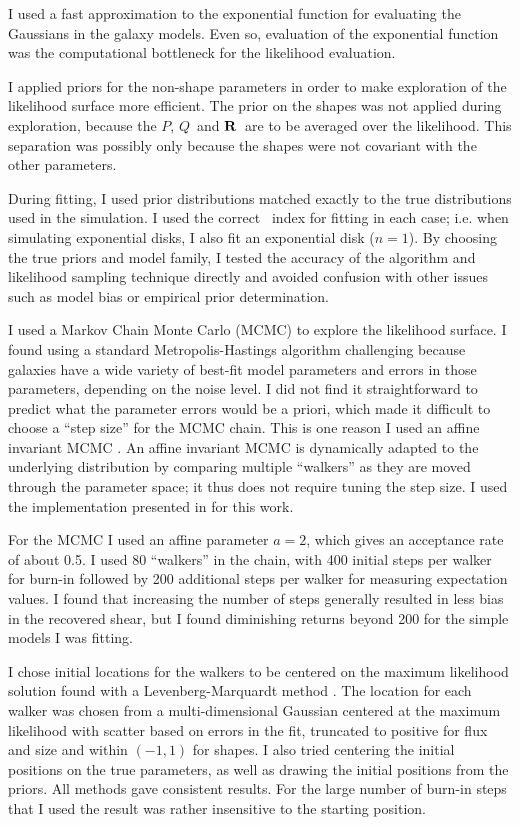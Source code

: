 \documentclass[usegraphicx,usenatbib]{mn2e}
\newcommand{\vecQ}{\mbox{\boldmath $Q$}}
\newcommand{\matR}{\mbox{$\bf R$}}
\begin{document}
I used a fast approximation to the exponential function for evaluating the
Gaussians in the galaxy models.  Even so, evaluation of the exponential
function was the computational bottleneck for the likelihood evaluation.

I applied priors for the non-shape parameters in order to make exploration of
the likelihood surface more efficient.  The prior on the shapes was not applied
during exploration, because the $P$, \vecQ\ and \matR\ are to be averaged over
the likelihood.  This separation was possibly only because the shapes were not
covariant with the other parameters.

During fitting, I used prior distributions matched exactly to the true
distributions used in the simulation.  I used the correct \sersic\ index for
fitting in each case; i.e. when simulating exponential disks, I also fit an
exponential disk ($n=1$).  By choosing the true priors and model family, I
tested the accuracy of the algorithm and likelihood sampling technique directly
and avoided confusion with other issues such as model bias or empirical prior
determination.

I used a Markov Chain Monte Carlo (MCMC) to explore the likelihood surface.  I
found using a standard Metropolis-Hastings algorithm \citep{Metropolis53}
challenging because galaxies have a wide variety of best-fit model parameters
and errors in those parameters, depending on the noise level.  I did not find
it straightforward to predict what the parameter errors would be a priori,
which made it difficult to choose a ``step size'' for the MCMC chain.  This is
one reason I used an affine invariant MCMC \citep{GoodmanWeare10}.  An affine
invariant MCMC is dynamically adapted to the underlying distribution by
comparing multiple ``walkers'' as they are moved through the parameter space;
it thus does not require tuning the step size.  I used the implementation
presented in \citet{Mackey13} for this work.

For the MCMC I used an affine parameter $a=2$, which gives an acceptance rate
of about 0.5. I used 80 ``walkers'' in the chain, with 400 initial steps per
walker for burn-in followed by 200 additional steps per walker for measuring
expectation values.  I found that increasing the number of steps generally
resulted in less bias in the recovered shear, but I found diminishing returns
beyond 200 for the simple models I was fitting.

I chose initial locations for the walkers to be centered on the maximum
likelihood solution found with a Levenberg-Marquardt method \citep{Lev44}. The
location for each walker was chosen from a multi-dimensional Gaussian centered
at the maximum likelihood with scatter based on errors in the fit, truncated to
positive for flux and size and within $(-1,1)$ for shapes.  I also tried
centering the initial positions on the true parameters, as well as drawing the
initial positions from the priors.  All methods gave consistent results.  For
the large number of burn-in steps that I used the result was rather insensitive
to the starting position.
\end{document}
